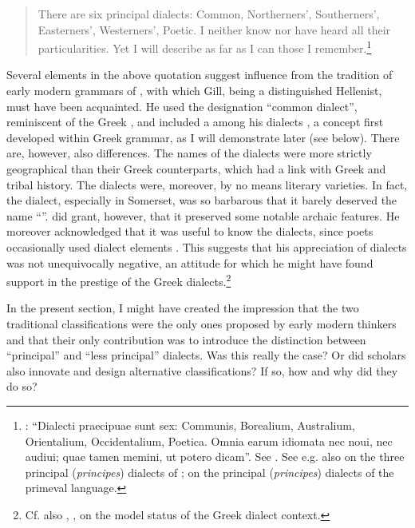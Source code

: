 \begin{quote}
There are six principal dialects: Common, Northerners’, Southerners’, Easterners’, Westerners’, Poetic. I neither know nor have heard all their particularities. Yet I will describe as far as I can those I remember.\footnote{\citet[15]{Gill1619}: “Dialecti praecipuae sunt sex: Communis, Borealium, Australium, Orientalium, Occidentalium, Poetica. Omnia earum idiomata nec noui, nec audiui; quae tamen memini, ut potero dicam”. See \citet{Kokeritz1938}. See e.g. also \citet[liv]{Thomassin1697} on the three principal (\textit{principes}) dialects of ; \citet[\textsc{xciii}]{Schultens1748} on the principal (\textit{principes}) dialects of the primeval language.}
\end{quote}

Several elements in the above quotation suggest influence from the tradition of early modern grammars of , with which Gill, being a distinguished Hellenist, must have been acquainted. He used the designation “common dialect”, reminiscent of the Greek , and included a  among his  dialects \citep[18]{Gill1619}, a concept first developed within Greek grammar, as I will demonstrate later (see  below). There are, however, also differences. The names of the  dialects were more strictly geographical than their Greek counterparts, which had a link with Greek  and tribal history. The  dialects were, moreover, by no means literary varieties. In fact, the  dialect, especially in Somerset, was so barbarous that it barely deserved the name “”. \citet[17]{Gill1619} did grant, however, that it preserved some notable archaic features. He moreover acknowledged that it was useful to know the dialects, since  poets occasionally used dialect elements \citep[18]{Gill1619}. This suggests that his appreciation of  dialects was not unequivocally negative, an attitude for which he might have found support in the prestige of the Greek dialects.\footnote{Cf. also , , on the model status of the Greek dialect context.}

In the present section, I might have created the impression that the two traditional classifications were the only ones proposed by early modern thinkers and that their only contribution was to introduce the distinction between “principal” and “less principal” dialects. Was this really the case? Or did scholars also innovate and design alternative classifications? If so, how and why did they do so?

